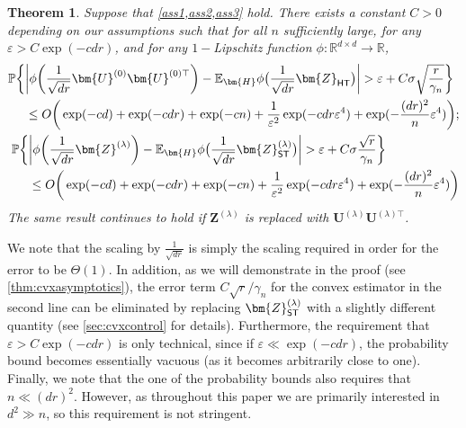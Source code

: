 \documentclass[10pt]{article}
\newcommand{\eps}{\ensuremath{\varepsilon}}
\newcommand{\p}{\mathbb{P}}
\newtheorem{theorem}{Theorem}
\theoremstyle{definition}
\begin{document}
\begin{theorem} \label{thm:mainthm}
Suppose that \cref{ass1,ass2,ass3} hold. 
There exists a constant $C > 0$ depending on our assumptions such that for all $n$ sufficiently large, 
for any $\eps> C\exp( - c dr )$, and for any $1-$Lipschitz function $\phi: \mathbb{R}^{d\times d} \to \mathbb{R}$,
\begin{align}
\begin{split}
    \p\bigg\{ &\bigg| \phi\bigg( \frac{1}{\sqrt{dr}}\bm{U}^{(0)} \bm{U}^{(0)\top} \bigg) - \mathbb{E}_{\bm{H}} \phi\big( \frac{1}{\sqrt{dr}}\bm{Z}_{{\sf HT}} \big) \bigg| > \eps + C \sigma \sqrt{\frac{r}{\gamma_n}}\bigg\} \\&\leq  
 O\bigg( \exp( - c d) +  \exp( - c dr) + \exp( - c n) + \frac{1}{\eps^2} \exp(-c dr \eps^4 ) + \exp( - \frac{(dr)^2}{n} \eps^4) \bigg); \end{split} \\
 \begin{split}
    \p\bigg\{ &\bigg| \phi\bigg( \frac{1}{\sqrt{dr}}\bm{Z}^{(\lambda)} \bigg) - \mathbb{E}_{\bm{H}} \phi\big( \frac{1}{\sqrt{dr}}\bm{Z}_{{\sf ST}}^{(\lambda)} \big) \bigg| > \eps + C \sigma \frac{\sqrt{r}}{\gamma_n}  \bigg\} \\
    &\leq  O\bigg( \exp( - c d) +  \exp( - c dr) + \exp( - c n) + \frac{1}{\eps^2} \exp(-c dr \eps^4 ) + \exp( - \frac{(dr)^2}{n} \eps^4) \bigg) \end{split}
\end{align}
The same result continues to hold if $\bm{Z}^{(\lambda)}$ is replaced with $\bm{U}^{(\lambda)} \bm{U}^{(\lambda)\top}$.  
\end{theorem}

We note that the scaling by $\frac{1}{\sqrt{dr}}$ is simply the scaling required in order for the error to be $\Theta(1)$. In addition, as we will demonstrate in the proof (see \cref{thm:cvxasymptotics}), the error term $C \sqrt{r}/\gamma_n $ for the convex estimator in the second line can be eliminated by replacing $\bm{Z}^{(\lambda)}_{{\sf ST}}$ with a slightly different quantity (see \cref{sec:cvxcontrol} for details).   Furthermore, the requirement that $\eps > C \exp( - c dr)$ is only technical, since if $\eps \ll \exp( -c dr)$, the probability bound becomes essentially vacuous (as it becomes arbitrarily close to one).  Finally, we note that the one of the probability bounds also requires that $n \ll (dr)^2$.  However, as throughout this paper we are primarily interested in $d^2 \gg n$, so this requirement is not stringent.
\end{document}
